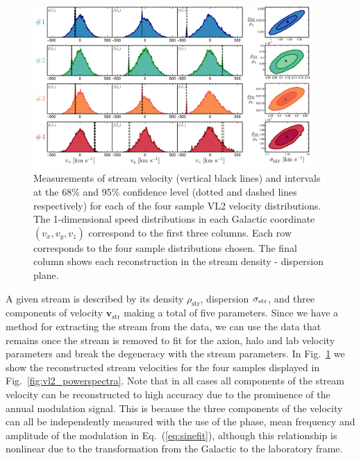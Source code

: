 \begin{figure}
\begin{center}
	\includegraphics[width=0.95\textwidth]{Figures/stream_estimate-eps-converted-to.pdf}
    \caption[Measuring axion stream velocity]{Measurements of stream velocity (vertical black lines) and intervals at the 68\% and 95\% confidence level (dotted and dashed lines respectively) for each of the four sample VL2 velocity distributions. The 1-dimensional speed distributions in each Galactic coordinate $(v_x,v_y,v_z)$ correspond to the first three columns. Each row corresponds to the four sample distributions chosen. The final column shows each reconstruction in the stream density - dispersion plane.}\label{fig:stream_estimate}
\end{center}
\end{figure}
A given stream is described by its density $\rho_\textrm{str}$, dispersion $\sigma_{\rm str}$, and three components of velocity $\textbf{v}_\textrm{str}$ making a total of five parameters. Since we have a method for extracting the stream from the data, we can use the data that remains once the stream is removed to fit for the axion, halo and lab velocity parameters and break the degeneracy with the stream parameters. In Fig.~\ref{fig:stream_estimate} we show the reconstructed stream velocities for the four samples displayed in Fig.~\ref{fig:vl2_powerspectra}. Note that in all cases all components of the stream velocity can be reconstructed to high accuracy due to the prominence of the annual modulation signal. This is because the three components of the velocity can all be independently measured with the use of the phase, mean frequency and amplitude of the modulation in Eq.~(\ref{eq:sinefit}), although this relationship is nonlinear due to the transformation from the Galactic to the laboratory frame.

